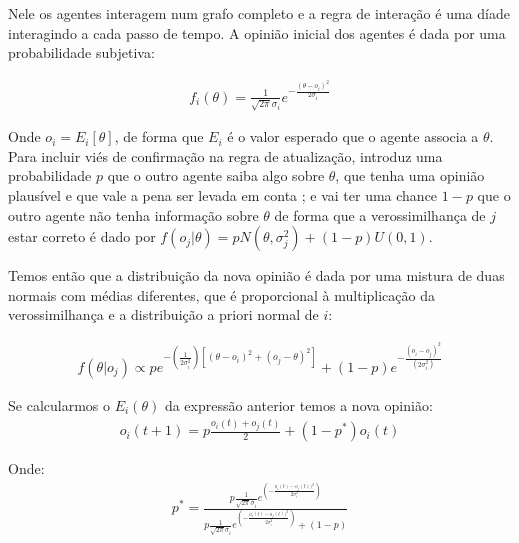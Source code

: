 Nele os agentes interagem num grafo completo e a regra de interação é uma díade
interagindo a cada passo de tempo. A opinião inicial dos agentes é dada por uma
probabilidade subjetiva:


\begin{align}
f_i(\theta) = \frac{1}{\sqrt{2 \pi} \sigma_i} e^{-
  \frac{(\theta - o_i )^2}{2 \sigma_i}}
  \end{align}

  Onde \(o_i = E_i[\theta] \), de forma que \(E_i\) é o valor esperado que o agente
  associa a \(\theta\). Para incluir viés de confirmação na regra de atualização,
   introduz uma probabilidade \(p\) que o outro
  agente saiba algo sobre $\theta$, que tenha uma opinião plausível e que vale
  a pena ser levada em conta ; e vai ter uma chance \(1 - p\) que o outro agente
  não tenha informação sobre $\theta$ de forma que a verossimilhança de $j$ estar
  correto é dado por $ f(o_j|\theta) = p N(\theta,\sigma_j^2) + (1-p)U(0,1)$.

  Temos então que a distribuição da nova opinião é dada por uma mistura de duas
  normais com médias diferentes, que é proporcional à  multiplicação da
  verossimilhança e a distribuição a priori normal de $i$:
  
  \begin{align}
    f(\theta | o_j)
    \propto 
    p
    e^
    {-(\frac{1}{2\sigma_i^2})
    [(\theta - o_i)^2
    +
    (o_j - \theta )^2
    ]}
    +
    (1-p)
    e^{-\frac{(o_i - o_j)^2}{(2 \sigma_i^2)}}
  \end{align}

 Se calcularmos o $E_i(\theta)$ da expressão anterior temos a nova opinião:
  \begin{align}
    o_i(t+1)
    =
    p
    \frac{o_i(t) + o_j(t)}{2}
    +
    (1-p^*)o_i(t)
  \end{align}

  Onde:
  \begin{align}
    p^*
    =
    \frac{
      p \frac{1}{\sqrt{2 \pi} \sigma_i}
      e^{(- \frac{o_i (t) - o_j (t))^2}{2 \sigma_i^2})}
    }{
      p
      \frac{1}{\sqrt{2 \pi} \sigma_i}
    e^{(- \frac{o_i (t) - o_j (t))^2}{2 \sigma_i^2})}
    +
    (1 - p)
    }
  \end{align}

